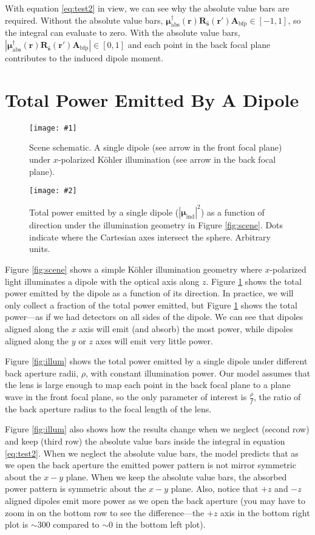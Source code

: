 \documentclass[11pt]{article}
\providecommand{\mb}[1]{\mathbf{#1}}
\providecommand{\bs}[1]{\boldsymbol{#1}}
\providecommand{\figs}[7]{
\begin{figure}[H]
\centering
\begin{minipage}[b]{.45\textwidth}
  \centering
  \texttt{[image: \#1]}
  \captionsetup{justification=justified, singlelinecheck=true}
  \caption{#3}
  \label{fig:#5}
\end{minipage}
\hspace{2em}
\begin{minipage}[b]{.45\textwidth}
  \centering
  \texttt{[image: \#2]}
  \vspace{#7em}
  \captionsetup{justification=justified}
  \caption{#4}
  \label{fig:#6}
\end{minipage}
\end{figure}
}
\begin{document}
With equation \ref{eq:test2} in view, we can see why the absolute value bars are
required. Without the absolute value bars,
$\bs{\mu}_{\text{abs}}^{\dagger}(\mb{r})
\mb{R}_{\mb{\hat{s}}}(\mb{r'})\mb{A}_{\text{bfp}} \in [-1, 1]$, so the integral
can evaluate to zero. With the absolute value bars,
$|\bs{\mu}_{\text{abs}}^{\dagger}(\mb{r})
\mb{R}_{\mb{\hat{s}}}(\mb{r'})\mb{A}_{\text{bfp}}| \in [0, 1]$ and each point in
the back focal plane contributes to the induced dipole moment.

\section{Total Power Emitted By A Dipole}
\figs{../figures/scene1}{../figures/intensity1}{Scene schematic. A single dipole (see arrow in the
  front focal plane) under $x$-polarized K\"{o}hler illumination (see arrow in
  the back focal plane).\\}{Total power emitted by a single dipole
  ($|\bs{\mu}_{\text{ind}}|^2$) as a function of direction under the illumination
  geometry in Figure \ref{fig:scene}. Dots indicate where the Cartesian axes
  intersect the sphere. Arbitrary units.}{scene}{int}{-0.2}

Figure \ref{fig:scene} shows a simple K\"{o}hler illumination geometry where
$x$-polarized light illuminates a dipole with the optical axis along $z$. Figure
\ref{fig:int} shows the total power emitted by the dipole as a function of its
direction. In practice, we will only collect a fraction of the total power
emitted, but Figure \ref{fig:int} shows the total power---as if we had
detectors on all sides of the dipole. We can see that dipoles
aligned along the $x$ axis will emit (and absorb) the most power, while dipoles
aligned along the $y$ or $z$ axes will emit very little power.

Figure \ref{fig:illum} shows the total power emitted by a single dipole under
different back aperture radii, $\rho$, with constant illumination power. Our
model assumes that the lens is large enough to map each point in the back focal
plane to a plane wave in the front focal plane, so the only parameter of
interest is $\frac{\rho}{f}$, the ratio of the back aperture radius to the focal
length of the lens.

Figure \ref{fig:illum} also shows how the results change when we neglect (second
row) and keep (third row) the absolute value bars inside the integral in
equation \ref{eq:test2}. When we neglect the absolute value bars, the model
predicts that as we open the back aperture the emitted power pattern is not
mirror symmetric about the $x-y$ plane. When we keep the absolute value bars,
the absorbed power pattern is symmetric about the $x-y$ plane. Also, notice that
$+z$ and $-z$ aligned dipoles emit more power as we open the back aperture (you
may have to zoom in on the bottom row to see the difference---the $+z$ axis in
the bottom right plot is $\sim 300$ compared to $\sim 0$ in the bottom left
plot). 
\end{document}
